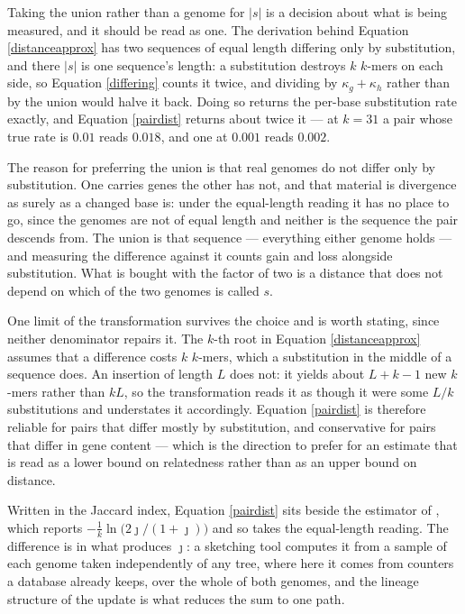 \documentclass[pdflatex,sn-vancouver-num]{sn-jnl}
\begin{document}
Taking the union rather than a genome for $|s|$ is a decision about what is being measured, and it
should be read as one. The derivation behind Equation \eqref{distanceapprox} has two sequences of
equal length differing only by substitution, and there $|s|$ is one sequence's length: a
substitution destroys $k$ $k$-mers on each side, so Equation \eqref{differing} counts it twice,
and dividing by $\kappa_g + \kappa_h$ rather than by the union would halve it back. Doing so returns
the per-base substitution rate exactly, and Equation \eqref{pairdist} returns about twice it --- at
$k = 31$ a pair whose true rate is $0.01$ reads $0.018$, and one at $0.001$ reads $0.002$.

The reason for preferring the union is that real genomes do not differ only by substitution. One
carries genes the other has not, and that material is divergence as surely as a changed base is:
under the equal-length reading it has no place to go, since the genomes are not of equal length and
neither is the sequence the pair descends from. The union is that sequence --- everything either
genome holds --- and measuring the difference against it counts gain and loss alongside
substitution. What is bought with the factor of two is a distance that does not depend on which of
the two genomes is called $s$.

One limit of the transformation survives the choice and is worth stating, since neither denominator
repairs it. The $k$-th root in Equation \eqref{distanceapprox} assumes that a difference costs $k$
$k$-mers, which a substitution in the middle of a sequence does. An insertion of length $L$ does
not: it yields about $L + k - 1$ new $k$-mers rather than $kL$, so the transformation reads it as
though it were some $L/k$ substitutions and understates it accordingly. Equation \eqref{pairdist} is
therefore reliable for pairs that differ mostly by substitution, and conservative for pairs that
differ in gene content --- which is the direction to prefer for an estimate that is read as a lower
bound on relatedness rather than as an upper bound on distance.

Written in the Jaccard index, Equation \eqref{pairdist} sits beside the estimator of
\cite{Ondov:2016aa}, which reports $-\frac{1}{k}\ln\bigl(2\jmath/(1+\jmath)\bigr)$ and so takes the
equal-length reading. The difference is in what produces $\jmath$: a sketching tool computes it from
a sample of each genome taken independently of any tree, where here it comes from counters a
database already keeps, over the whole of both genomes, and the lineage structure of the update is
what reduces the sum to one path.
\end{document}
